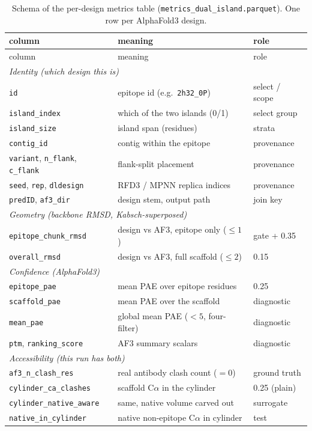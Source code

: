 \begin{center}
\begin{longtable}{lll}
\caption{Schema of the per-design metrics table (\texttt{metrics\_dual\_island.parquet}).
One row per AlphaFold3 design.}\label{tab:metricschema}\\
\toprule
column & meaning & role \\
\midrule
\endfirsthead
\toprule column & meaning & role \\ \midrule \endhead
\multicolumn{3}{l}{\emph{Identity (which design this is)}}\\
\texttt{id}            & epitope id (e.g.\ \texttt{2h32\_0P}) & select / scope \\
\texttt{island\_index} & which of the two islands (0/1)        & select group \\
\texttt{island\_size}  & island span (residues)                & strata \\
\texttt{contig\_id}    & contig within the epitope             & provenance \\
\texttt{variant}, \texttt{n\_flank}, \texttt{c\_flank} & flank-split placement & provenance \\
\texttt{seed}, \texttt{rep}, \texttt{dldesign} & RFD3 / MPNN replica indices & provenance \\
\texttt{predID}, \texttt{af3\_dir} & design stem, output path     & join key \\
\midrule
\multicolumn{3}{l}{\emph{Geometry (backbone RMSD, Kabsch-superposed)}}\\
\texttt{epitope\_chunk\_rmsd} & design vs AF3, epitope only ($\le 1$) & gate + 0.35 \\
\texttt{overall\_rmsd}        & design vs AF3, full scaffold ($\le 2$) & 0.15 \\
\midrule
\multicolumn{3}{l}{\emph{Confidence (AlphaFold3)}}\\
\texttt{epitope\_pae}  & mean PAE over epitope residues   & 0.25 \\
\texttt{scaffold\_pae} & mean PAE over the scaffold        & diagnostic \\
\texttt{mean\_pae}     & global mean PAE ($<5$, four-filter) & diagnostic \\
\texttt{ptm}, \texttt{ranking\_score} & AF3 summary scalars & diagnostic \\
\midrule
\multicolumn{3}{l}{\emph{Accessibility (this run has both)}}\\
\texttt{af3\_n\_clash\_res} & real antibody clash count ($=0$) & ground truth \\
\texttt{cylinder\_ca\_clashes}   & scaffold C$\alpha$ in the cylinder & 0.25 (plain) \\
\texttt{cylinder\_native\_aware} & same, native volume carved out     & surrogate \\
\texttt{native\_in\_cylinder}    & native non-epitope C$\alpha$ in cylinder & test \\
\bottomrule
\end{longtable}
\end{center}

